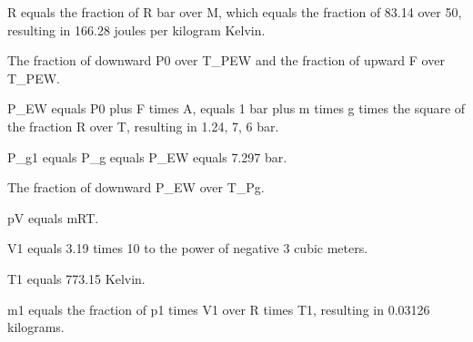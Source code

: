 R equals the fraction of R bar over M, which equals the fraction of 83.14 over 50, resulting in 166.28 joules per kilogram Kelvin.

The fraction of downward P0 over T_PEW and the fraction of upward F over T_PEW.

P_EW equals P0 plus F times A, equals 1 bar plus m times g times the square of the fraction R over T, resulting in 1.24, 7, 6 bar.

P_g1 equals P_g equals P_EW equals 7.297 bar.

The fraction of downward P_EW over T_Pg.

pV equals mRT.

V1 equals 3.19 times 10 to the power of negative 3 cubic meters.

T1 equals 773.15 Kelvin.

m1 equals the fraction of p1 times V1 over R times T1, resulting in 0.03126 kilograms.